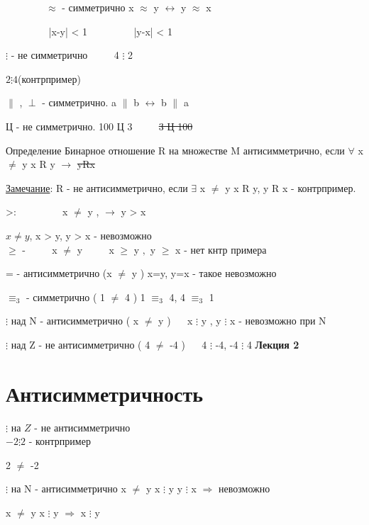 \documentclass{article}
\begin{document}
    $\qquad \qquad \approx$ -  симметрично x $\approx$ y $\leftrightarrow $ y $\approx$ x
    
    $\qquad \qquad$ |x-y| < 1 $\qquad \qquad$ |y-x| < 1
    
    
    $\vdots$  - не симметрично $\qquad$  4 $\vdots$ 2 $\qquad \qquad$
    
    \sout{$2\vdots4$}(контрпример)
    
    
    $\parallel$ , $\perp $ - симметрично. a $\parallel$ b $\leftrightarrow $ b $\parallel$ a
    
    Ц - не симметрично. 100 Ц 3 $\qquad$ \sout{3 Ц 100}
    
    Определение Бинарное отношение R на множестве M антисимметрично, если $\forall$ x $\neq$ y 
    x R y $\rightarrow$ \sout{yRx}
    
    \underline{Замечание}: R - не антисимметрично, если $\exists$ x $\neq$ y  x R y, y R x - контрпример.
    
     >: $\qquad \qquad$ x $\neq$ y , $\rightarrow$ y > x
     
     $ x \neq y $, x > y, y > x - невозможно\\
     
     $\geq$ - $\qquad$ x $\neq$ y $\qquad $ x $\geq$ y $, $ y $\geq$ x - нет кнтр примера
     
     = - антисимметрично (x $\neq$ y ) x=y, y=x - такое невозможно
     
     $\equiv_3$ - симметрично ( 1 $\neq$ 4  ) 1 $ \equiv_3$ 4, 4 $\equiv_3$ 1
     
     $\vdots$ над N - антисимметрично ( x $\neq$ y ) $\quad$ x $\vdots$ y , y $\vdots$ x  - невозможно при N
     
     
     
     $\vdots$ над Z - не антисимметрично ( 4 $\neq$ -4 ) $\quad$ 4 $\vdots$ -4, -4 $\vdots$ 4
    \textbf{Лекция 2}
    \section{Антисимметричность}

$\vdots$ на $Z$ - не антисимметрично\\
\quad \quad \quad $ -2 \vdots 2$ - контрпример

2 $\neq$ -2 

$\vdots$ на N - антисимметрично x $\neq$ y x $\vdots$ y y $\vdots$ x $\Rightarrow$ невозможно

x $\neq$ y x $\vdots$ y $\Rightarrow$  x \sout{$\vdots$} y
\end{document}

